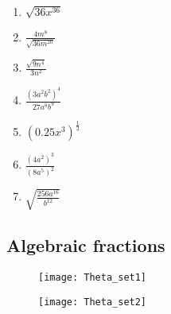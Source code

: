 \documentclass[a4paper,12pt]{article}
\begin{document}
\begin{enumerate}[label=\normalsize \arabic*)~~~ , leftmargin=1cm]
\begin{multicols}{3}
\begin{enumerate}[label=\normalsize \alph*)~~~ , topsep=8pt,itemsep=5pt,partopsep=4pt, parsep=4pt]
		\item $\displaystyle\sqrt{36x^{36}}$\\
		\item $\displaystyle\frac{4m^8}{\sqrt{36m^{20}}}$\\
		\item $\displaystyle\frac{\sqrt{9n^{4}}}{3n^2}$\\
		\item $\displaystyle\frac{(3a^2b^2)^4}{27 a^8b^9}$\\ 
		\item $\displaystyle (0.25 x^3)^\frac{1}{2}$\\
		\item $\displaystyle \frac{(4a^2)^3}{(8a^5)^2}$\\  
		\item $\displaystyle \sqrt{\frac{256 a^{16}}{b^{12}}}$\\
	\end{enumerate}
\end{multicols}\vspace{1cm}

\end{enumerate}
\newpage
\subsection*{Algebraic fractions}
\begin{figure}[!h]
	\centering
	\texttt{[image: Theta\_set1]}
\end{figure}
\newpage
\begin{figure}[!h]
	\centering
	\texttt{[image: Theta\_set2]}
\end{figure}
\end{document}
